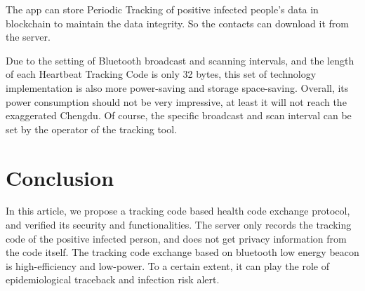 \documentclass[11pt,en]{elegantpaper}
\begin{document}
The app can store Periodic Tracking of positive infected people's data in blockchain to maintain the data integrity. So the contacts can download it from the server. 

Due to the setting of Bluetooth broadcast and scanning intervals, and the length of each Heartbeat Tracking Code is only 32 bytes, this set of technology implementation is also more power-saving and storage space-saving\cite{aiello2009bluetooth}. Overall, its power consumption should not be very impressive, at least it will not reach the exaggerated Chengdu. Of course, the specific broadcast and scan interval can be set by the operator of the tracking tool.

\section{Conclusion}
In this article, we propose a tracking code based health code exchange protocol, and verified its security and functionalities. The server only records the tracking code of the positive infected person, and does not get privacy information from the code itself. The tracking code exchange based on bluetooth low energy beacon is high-efficiency and low-power. To a certain extent, it can play the role of epidemiological traceback and infection risk alert.


\end{document}
